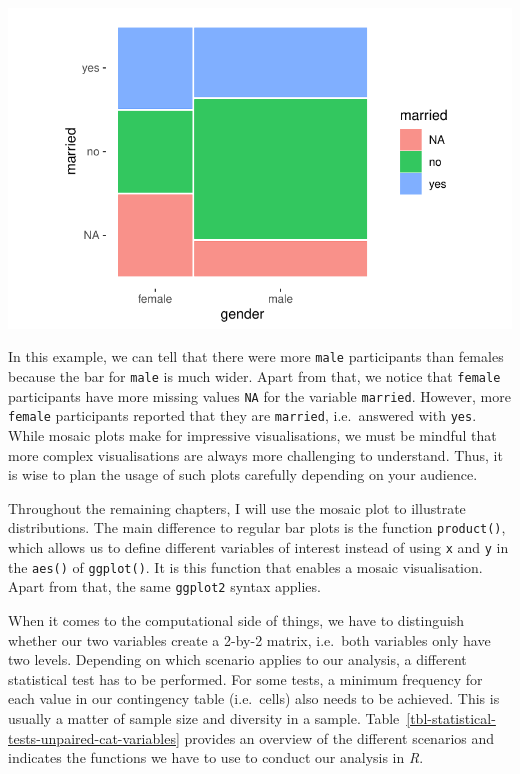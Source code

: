 \documentclass[
  letterpaper,
]{krantz}
\begin{document}
\includegraphics{11_group_comparison_files/figure-pdf/mosaic-plot-gender-married-plot-1.pdf}

In this example, we can tell that there were more \texttt{male}
participants than females because the bar for \texttt{male} is much
wider. Apart from that, we notice that \texttt{female} participants have
more missing values \texttt{NA} for the variable \texttt{married}.
However, more \texttt{female} participants reported that they are
\texttt{married}, i.e.~answered with \texttt{yes}. While mosaic plots
make for impressive visualisations, we must be mindful that more complex
visualisations are always more challenging to understand. Thus, it is
wise to plan the usage of such plots carefully depending on your
audience.

Throughout the remaining chapters, I will use the mosaic plot to
illustrate distributions. The main difference to regular bar plots is
the function \texttt{product()}, which allows us to define different
variables of interest instead of using \texttt{x} and \texttt{y} in the
\texttt{aes()} of \texttt{ggplot()}. It is this function that enables a
mosaic visualisation. Apart from that, the same \texttt{ggplot2} syntax
applies.

When it comes to the computational side of things, we have to
distinguish whether our two variables create a 2-by-2 matrix, i.e.~both
variables only have two levels. Depending on which scenario applies to
our analysis, a different statistical test has to be performed. For some
tests, a minimum frequency for each value in our contingency table
(i.e.~cells) also needs to be achieved. This is usually a matter of
sample size and diversity in a sample.
Table~\ref{tbl-statistical-tests-unpaired-cat-variables} provides an
overview of the different scenarios and indicates the functions we have
to use to conduct our analysis in \emph{R}.
\end{document}
